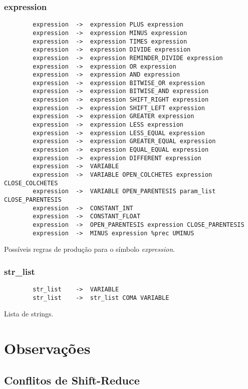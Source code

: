 \documentclass[a4paper,10pt]{article}
\begin{document}
	\subsubsection{expression}
		\begin{lstlisting}
		expression	->	expression PLUS expression 
		expression	->	expression MINUS expression   	     
		expression	->	expression TIMES expression   	  
		expression	->	expression DIVIDE expression	 
		expression	->	expression REMINDER_DIVIDE expression	 
		expression	->	expression OR expression
		expression	->	expression AND expression
		expression	->	expression BITWISE_OR expression
		expression	->	expression BITWISE_AND expression
		expression	->	expression SHIFT_RIGHT expression
		expression	->	expression SHIFT_LEFT expression
		expression	->	expression GREATER expression
		expression	->	expression LESS expression
		expression	->	expression LESS_EQUAL expression
		expression	->	expression GREATER_EQUAL expression
		expression	->	expression EQUAL_EQUAL expression
		expression	->	expression DIFFERENT expression
		expression	->	VARIABLE
		expression	->	VARIABLE OPEN_COLCHETES expression CLOSE_COLCHETES
		expression	->	VARIABLE OPEN_PARENTESIS param_list CLOSE_PARENTESIS
		expression	->	CONSTANT_INT 
		expression	->	CONSTANT_FLOAT 
		expression	->	OPEN_PARENTESIS expression CLOSE_PARENTESIS
		expression	->	MINUS expression %prec UMINUS
		\end{lstlisting}
		Poss\'iveis regras de produ\c{c}\~ao para o s\'imbolo \emph{expression}.

		\vspace{10mm}
	\subsubsection{str\_list}
		\begin{lstlisting}
		str_list	->	VARIABLE
		str_list	->	str_list COMA VARIABLE
		\end{lstlisting}
		Lista de strings.
		
		\vspace{10mm}

\section{Observa\c{c}\~oes}
  \subsection{Conflitos de Shift-Reduce}
  
\end{document}

